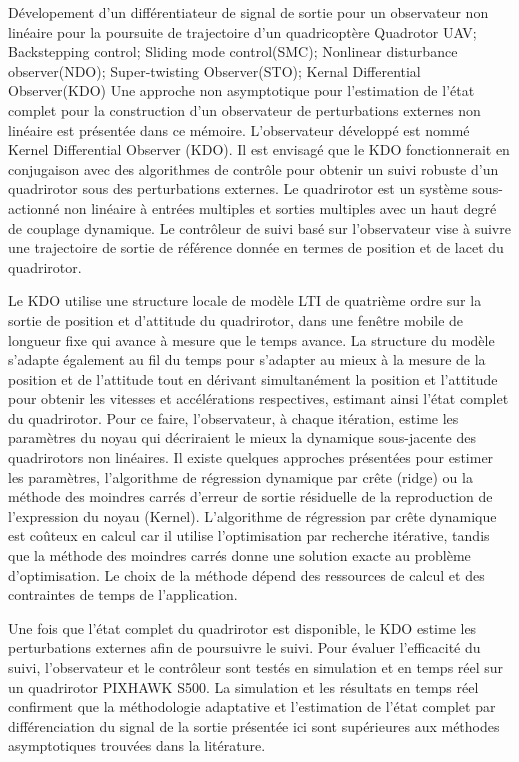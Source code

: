 \documentclass[letterpaper%
, twoside%
, 12pt%
,memoire%
, english%
,creativecommons,hyperref%
]{thETS}
\theoremstyle{newThmStyle}
\begin{document}
\begin{summary}{Dévelopement d'un différentiateur de signal de sortie pour un observateur non linéaire pour la poursuite de trajectoire d’un quadricoptère }{Quadrotor UAV; Backstepping control; Sliding mode control(SMC); Nonlinear disturbance observer(NDO); Super-twisting Observer(STO); Kernal Differential Observer(KDO)}
Une approche non asymptotique pour l'estimation de l'état complet pour la construction d'un observateur de perturbations externes non linéaire est présentée dans ce mémoire. L'observateur développé est nommé Kernel Differential Observer (KDO). Il est envisagé que le KDO fonctionnerait en conjugaison avec des algorithmes de contrôle pour obtenir un suivi robuste d'un quadrirotor sous des perturbations externes. Le quadrirotor est un système sous-actionné non linéaire à entrées multiples et sorties multiples avec un haut degré de couplage dynamique. Le contrôleur de suivi basé sur l'observateur vise à suivre une trajectoire de sortie de référence donnée en termes de position et de lacet du quadrirotor.

Le KDO utilise une structure locale de modèle LTI de quatrième ordre sur la sortie de position et d'attitude du quadrirotor, dans une fenêtre mobile de longueur fixe qui avance à mesure que le temps avance. La structure du modèle s'adapte également au fil du temps pour s'adapter au mieux à la mesure de la position et de l'attitude tout en dérivant simultanément la position et l'attitude pour obtenir les vitesses et accélérations respectives, estimant ainsi l'état complet du quadrirotor. Pour ce faire, l'observateur, à chaque itération, estime les paramètres du noyau qui décriraient le mieux la dynamique sous-jacente des quadrirotors non linéaires. Il existe quelques approches présentées pour estimer les paramètres, l'algorithme de régression dynamique par crête (ridge) ou la méthode des moindres carrés d'erreur de sortie résiduelle de la reproduction de l'expression du noyau (Kernel). L'algorithme de régression par crête dynamique est coûteux en calcul car il utilise l'optimisation par recherche itérative, tandis que la méthode des moindres carrés donne une solution exacte au problème d'optimisation. Le choix de la méthode dépend des ressources de calcul et des contraintes de temps de l'application.

Une fois que l'état complet du quadrirotor est disponible, le KDO estime les perturbations externes afin de poursuivre le suivi. Pour évaluer l'efficacité du suivi, l'observateur et le contrôleur sont testés en simulation et en temps réel sur un quadrirotor PIXHAWK S500. La simulation et les résultats en temps réel confirment que la méthodologie adaptative et l'estimation de l'état complet par différenciation du signal de la sortie présentée ici sont supérieures aux méthodes asymptotiques trouvées dans la litérature.

\end{summary}
\end{document}
